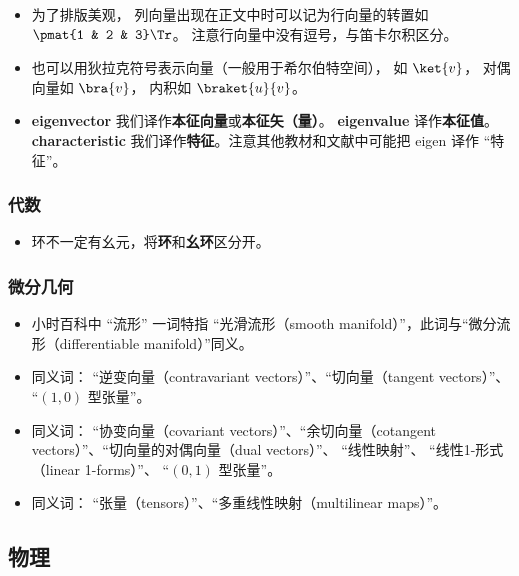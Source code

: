 \begin{itemize}
\item 为了排版美观， 列向量出现在正文中时可以记为行向量的转置如 $\pmat{1 & 2 & 3}\Tr$。 注意行向量中没有逗号，与笛卡尔积区分。
\item 也可以用狄拉克符号表示向量（一般用于希尔伯特空间）， 如 $\ket{v}$， 对偶向量如 $\bra{v}$， 内积如 $\braket{u}{v}$。
\item \textbf{eigenvector} 我们译作\textbf{本征向量}或\textbf{本征矢（量）}。 \textbf{eigenvalue} 译作\textbf{本征值}。 \textbf{characteristic} 我们译作\textbf{特征}。注意其他教材和文献中可能把 eigen 译作 “特征”。
\end{itemize}

\subsubsection{代数}
\begin{itemize}
\item 环不一定有幺元，将\textbf{环}和\textbf{幺环}区分开。
\end{itemize}


\subsubsection{微分几何}
\begin{itemize}
\item 小时百科中 “流形” 一词特指 “光滑流形（smooth manifold）”，此词与“微分流形（differentiable manifold）”同义。
\item 同义词： “逆变向量（contravariant vectors）”、“切向量（tangent vectors）”、 “$(1, 0)$ 型张量”。
\item 同义词： “协变向量（covariant vectors）”、“余切向量（cotangent vectors）”、“切向量的对偶向量（dual vectors）”、 “线性映射”、 “线性1-形式（linear 1-forms）”、 “$(0, 1)$ 型张量”。
\item 同义词： “张量（tensors）”、“多重线性映射（multilinear maps）”。
\end{itemize}

\subsection{物理}
